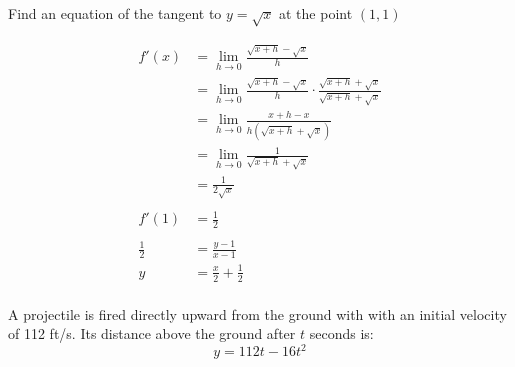 \documentclass[letterpaper, landscape]{exam}
\begin{document}
\begin{questions}
      \question[10] Find an equation of the tangent to $y = \sqrt{x}$ at the point $(1, 1)$
      \begin{solution}
        \begin{align*}
          f'(x) & = \lim_{h \to 0} \frac{\sqrt{x + h} - \sqrt{x}}{h} \\
                & = \lim_{h \to 0} \frac{\sqrt{x + h} - \sqrt{x}}{h} \cdot \frac{\sqrt{x + h} + \sqrt{x}}{\sqrt{x + h} + \sqrt{x}} \\
                & = \lim_{h \to 0} \frac{x + h - x}{h \left( \sqrt{x + h} + \sqrt{x} \right)} \\
                & = \lim_{h \to 0} \frac{1}{ \sqrt{x + h} + \sqrt{x} } \\
                & = \frac{1}{2 \sqrt{x}} \\
          \\
          f'(1) &= \frac{1}{2} \\
          \\
          \frac{1}{2} & = \frac{y - 1}{x - 1} \\
          y           & = \boxed{ \frac{x}{2} + \frac{1}{2} } \\
        \end{align*}
      \end{solution}

      \question
      A projectile is fired directly upward from the ground with with an initial velocity
      of 112 ft/s. Its distance above the ground after $t$ seconds is:
      \[
        y = 112t - 16t^2 
      \]


  \end{questions}
\end{document}

